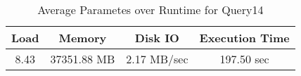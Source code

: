 \documentclass[../../main.tex]{subfiles}
\begin{document}
    \begin{table}
        \begin{center}
            \begin{tabular}{ |c|c|c|c| } 
            \hline
            Load & Memory & Disk IO & Execution Time\\
            \hline
            8.43 & 37351.88 MB & 2.17 MB/sec & 197.50 sec \\
            \hline
            \end{tabular}
            \\[1pt]
            \caption{Average Parametes over Runtime for Query14}
        \end{center}
    \end{table}
    \pagebreak
\end{document}
